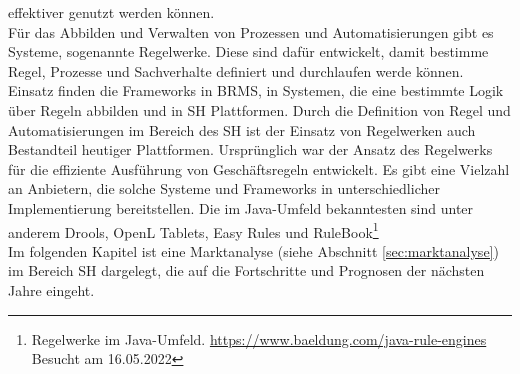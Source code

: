        effektiver genutzt werden können. 
        \\ 
        \linebreak
        Für das Abbilden und Verwalten von Prozessen und Automatisierungen gibt es Systeme, sogenannte Regelwerke. 
        Diese sind dafür entwickelt, damit bestimme Regel, Prozesse und Sachverhalte definiert und durchlaufen werde können. 
        Einsatz finden die Frameworks in \ac{BRMS}, in Systemen, die eine bestimmte Logik über 
        Regeln abbilden und in \acl{SH} Plattformen. Durch die Definition von Regel und Automatisierungen im Bereich des 
        \acl{SH} ist der Einsatz von Regelwerken auch Bestandteil heutiger Plattformen. Ursprünglich war der Ansatz des Regelwerks 
        für die effiziente Ausführung von Geschäftsregeln entwickelt. Es gibt eine Vielzahl an Anbietern, die solche Systeme und Frameworks 
        in unterschiedlicher Implementierung bereitstellen. Die im Java-Umfeld bekanntesten sind unter anderem Drools, OpenL Tablets, 
        Easy Rules und RuleBook\footnote{Regelwerke im Java-Umfeld. \url{https://www.baeldung.com/java-rule-engines} Besucht am 16.05.2022}
        \\
        Im folgenden Kapitel ist eine Marktanalyse (siehe Abschnitt \ref{sec:marktanalyse}) im Bereich \acl{SH} dargelegt, die auf die Fortschritte 
        und Prognosen der nächsten Jahre eingeht.
